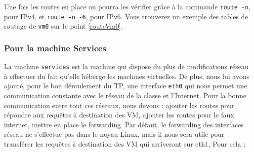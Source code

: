 			Une fois les routes en place on pourra les vérifier grâce à la commande \verb?route -n?, pour IPv4, et \verb?route -n -6?, pour IPv6. Vous trouverez un exemple des tables de routage de \verb?vm0? sur le point \ref{routeVm0}.

		\subsubsection{Pour la machine Services}
			\vspace{0.3cm}
			La machine \verb?services? est la machine qui dispose du plus de modifications réseau à effectuer du fait qu'elle héberge les machines virtuelles. De plus, nous lui avons ajouté, pour le bon déroulement du TP, une interface \verb?eth0? qui nous permet une communication constante avec le réseau de la classe et l'Internet. Pour la bonne communication entre tout ces réseaux, nous devons : ajouter les routes pour répondre aux requêtes à destination des VM, ajouter les routes pour le faux internet, mettre en place le forwarding. Par défaut, le forwarding des interfaces réseau ne s'effectue pas dans le noyau Linux, mais il nous sera utile pour transférer les requêtes à destination des VM qui arriveront sur eth1. Pour cela :\\

			\\
			
